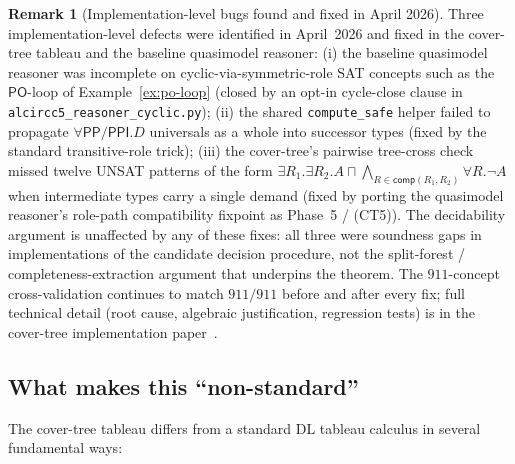 \documentclass[
]{ceurart}
\theoremstyle{definition}
\newtheorem{remark}[theorem]{Remark}
\newcommand{\PO}{\ensuremath{\mathsf{PO}}}
\newcommand{\PP}{\ensuremath{\mathsf{PP}}}
\newcommand{\PPI}{\ensuremath{\mathsf{PPI}}}
\newcommand{\comp}{\ensuremath{\mathsf{comp}}}
\begin{document}
\begin{remark}[Implementation-level bugs found and fixed in April 2026]
\label{rem:impl-bugs}
Three implementation-level defects were identified in April~2026
and fixed in the cover-tree tableau and the baseline quasimodel
reasoner: (i) the baseline quasimodel reasoner was incomplete on
cyclic-via-symmetric-role SAT concepts such as the
$\PO$-loop of Example~\ref{ex:po-loop} (closed by an opt-in
cycle-close clause in \texttt{alcircc5\_reasoner\_cyclic.py});
(ii) the shared \texttt{compute\_safe} helper failed to propagate
$\forall\PP/\PPI.D$ universals as a whole into successor types
(fixed by the standard transitive-role trick); (iii) the
cover-tree's pairwise tree-cross check missed twelve UNSAT
patterns of the form $\exists R_1.\exists R_2.A\sqcap
\bigwedge_{R\in\comp(R_1,R_2)}\forall R.\neg A$ when intermediate
types carry a single demand (fixed by porting the quasimodel
reasoner's role-path compatibility fixpoint as Phase~5 / (CT5)).
The decidability argument is unaffected by any of these fixes:
all three were soundness gaps in implementations of the
candidate decision procedure, not the split-forest /
completeness-extraction argument that underpins the theorem.
The $911$-concept cross-validation continues to match $911/911$
before and after every fix; full technical detail (root cause,
algebraic justification, regression tests) is in the cover-tree
implementation paper~\cite{CoverTreeImpl}.
\end{remark}

\subsection{What makes this ``non-standard''}

The cover-tree tableau differs from a standard DL tableau
calculus in several fundamental ways:
\end{document}
